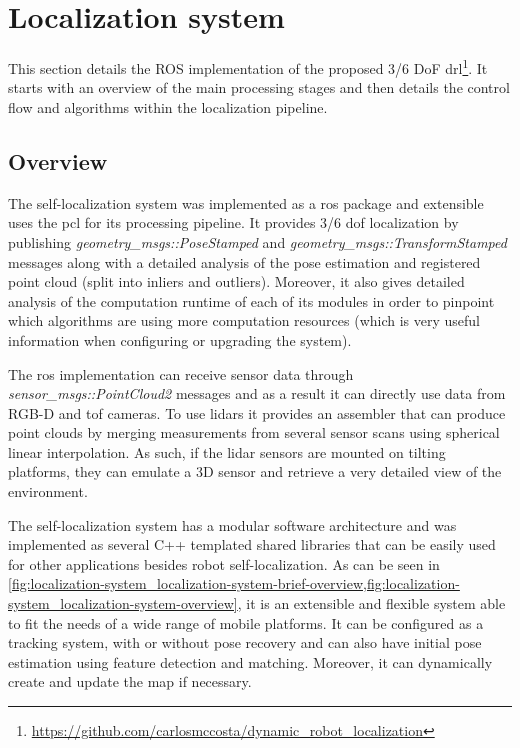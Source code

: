 \section{Localization system}\label{sec:localization-system}

This section details the ROS implementation of the proposed 3/6 DoF \gls{drl}\footnote{\url{https://github.com/carlosmccosta/dynamic_robot_localization}}. It starts with an overview of the main processing stages and then details the control flow and algorithms within the localization pipeline.

\subsection{Overview}

The self-localization system was implemented as a \gls{ros} package and extensible uses the \gls{pcl} \cite{Rusu2011} for its processing pipeline. It provides 3/6 \gls{dof} localization by publishing \emph{geometry\_msgs::PoseStamped} and \emph{geometry\_msgs::TransformStamped} messages along with a detailed analysis of the pose estimation and registered point cloud (split into inliers and outliers). Moreover, it also gives detailed analysis of the computation runtime of each of its modules in order to pinpoint which algorithms are using more computation resources (which is very useful information when configuring or upgrading the system).

The \gls{ros} implementation can receive sensor data through \emph{sensor\_msgs::PointCloud2} messages and as a result it can directly use data from RGB-D and \gls{tof} cameras. To use \glspl{lidar} it provides an assembler that can produce point clouds by merging measurements from several sensor scans using spherical linear interpolation. As such, if the \gls{lidar} sensors are mounted on tilting platforms, they can emulate a 3D sensor and retrieve a very detailed view of the environment.

The self-localization system has a modular software architecture and was implemented as several C++ templated shared libraries that can be easily used for other applications besides robot self-localization. As can be seen in \cref{fig:localization-system_localization-system-brief-overview,fig:localization-system_localization-system-overview}, it is an extensible and flexible system able to fit the needs of a wide range of mobile platforms. It can be configured as a tracking system, with or without pose recovery and can also have initial pose estimation using feature detection and matching. Moreover, it can dynamically create and update the map if necessary.

